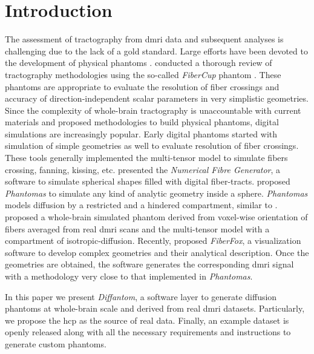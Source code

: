 \documentclass[english]{frontiers/frontiersSCNS} %
\begin{document}
\section*{Introduction}
The assessment of tractography from \gls*{dmri} data and subsequent analyses is challenging due to
  the lack of a gold standard.
Large efforts have been devoted to the development of physical phantoms
  \citep{lin_validation_2001,campbell_flowbased_2005,perrin_validation_2005,fieremans_simulation_2008,tournier_resolving_2008}.
\cite{cote_tractometer_2013} conducted a thorough review of tractography methodologies using the
  so-called \emph{FiberCup} phantom \citep{poupon_new_2008,fillard_quantitative_2011}.
These phantoms are appropriate to evaluate the resolution of fiber crossings and accuracy of
  direction-independent scalar parameters in very simplistic geometries.
Since the complexity of whole-brain tractography is unaccountable with current materials and proposed
  methodologies to build physical phantoms, digital simulations are increasingly popular.
Early digital phantoms started with simulation of simple geometries as well
  \citep{basser_in_2000,goessl_fiber_2002,tournier_limitations_2002,leemans_mathematical_2005}
  to evaluate resolution of fiber crossings.
These tools generally implemented the multi-tensor model \citep{alexander_analysis_2001,tuch_high_2002}
  to simulate fibers crossing, fanning, kissing, etc.
\cite{close_software_2009} presented the \emph{Numerical Fibre Generator}, a software to simulate
  spherical shapes filled with digital fiber-tracts.
\cite{caruyer_phantomas_2014} proposed \emph{Phantomas} to simulate any kind of analytic geometry
  inside a sphere.
\emph{Phantomas} models diffusion by a restricted and a hindered compartment, similar to
  \citep{assaf_composite_2005}.
\cite{wilkins_fiber_2014} proposed a whole-brain simulated phantom derived from voxel-wise orientation
  of fibers averaged from real \gls*{dmri} scans and the multi-tensor model with a compartment of
  isotropic-diffusion.
Recently, \cite{neher_fiberfox_2014} proposed \emph{FiberFox}, a visualization software to develop
  complex geometries and their analytical description.
Once the geometries are obtained, the software generates the corresponding \gls*{dmri} signal with a
  methodology very close to that implemented in \emph{Phantomas}.

In this paper we present \emph{Diffantom}, a software layer to generate diffusion phantoms at whole-brain
  scale and derived from real \gls*{dmri} datasets.
Particularly, we propose the \gls*{hcp} \citep{essen_human_2012} as the source of real data.
Finally, an example dataset is openly released along with all the necessary requirements and instructions
  to generate custom phantoms.
\end{document}
